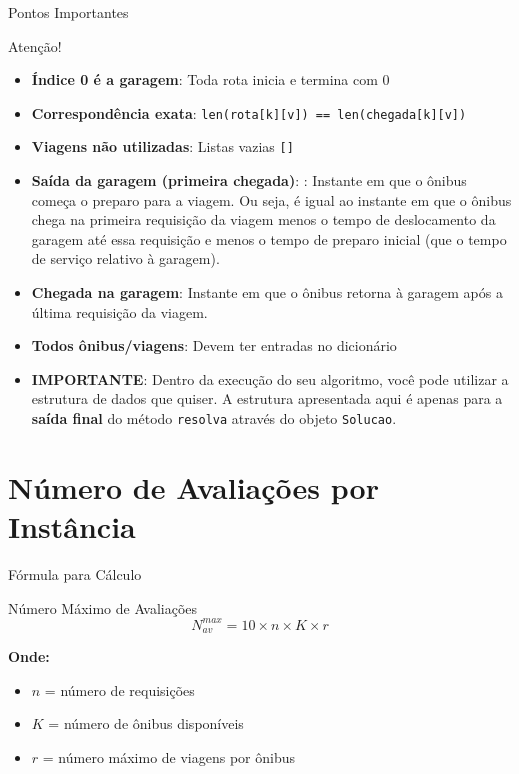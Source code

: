 \documentclass[10pt]{beamer}
\begin{document}
\begin{frame}{Pontos Importantes}
    \begin{alertblock}{Atenção!}
        \begin{itemize}
            \item \textbf{Índice 0 é a garagem}: Toda rota inicia e termina com 0
            \item \textbf{Correspondência exata}: \texttt{len(rota[k][v]) == len(chegada[k][v])}
            \item \textbf{Viagens não utilizadas}: Listas vazias \texttt{[]}
            \item \textbf{Saída da garagem (primeira chegada)}: : Instante em que o ônibus começa o preparo para a viagem. Ou seja, é igual ao instante em que o ônibus chega na primeira requisição da viagem menos o tempo de deslocamento da garagem até essa requisição e menos o tempo de preparo inicial (que o tempo de serviço relativo à garagem).
            \item \textbf{Chegada na garagem}: Instante em que o ônibus retorna à garagem após a última requisição da viagem.
            \item \textbf{Todos ônibus/viagens}: Devem ter entradas no dicionário
            \item \textbf{IMPORTANTE}: Dentro da execução do seu algoritmo, você pode utilizar a estrutura de dados que quiser. A estrutura apresentada aqui é apenas para a \textbf{saída final} do método \texttt{resolva} através do objeto \texttt{Solucao}.
        \end{itemize}
    \end{alertblock}
\end{frame}

\section{Número de Avaliações por Instância}

\begin{frame}{Fórmula para Cálculo}
    \begin{block}{Número Máximo de Avaliações}
        \begin{equation*}
            N^{max}_{av} = 10 \times n \times K \times r
        \end{equation*}
    \end{block}
    
    \vspace{0.5cm}
    
    \textbf{Onde:}
    \begin{itemize}
        \item $n$ = número de requisições
        \item $K$ = número de ônibus disponíveis
        \item $r$ = número máximo de viagens por ônibus
    \end{itemize}
\end{frame}
\end{document}
